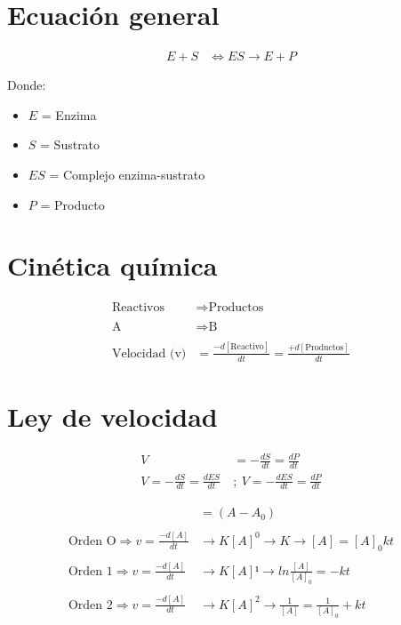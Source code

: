 \section{Ecuación general}

\begin{align*}
    E+S &\Longleftrightarrow ES \longrightarrow E + P
\end{align*}

Donde:

\begin{itemize}
    \item $E$ = Enzima
    \item $S$ = Sustrato
    \item $ES$ = Complejo enzima-sustrato
    \item $P$ = Producto
\end{itemize}

\section{Cinética química}

\begin{align*}
    \text{Reactivos} &\Longrightarrow \text{Productos} 
    \\
    \\
    \text{A} &\Longrightarrow \text{B}
    \\
    \\
    \text{Velocidad (v)} &= \frac{-d[\text{Reactivo}]}{dt}=\frac{+d[\text{Productos}]}{dt}
\end{align*}

\section{Ley de velocidad}

\begin{align*}
    V &= -\frac{dS}{dt} = \frac{dP}{dt}
    \\
    V = -\frac{dS}{dt} = \frac{dES}{dt} \ &; \ V = -\frac{dES}{dt} = \frac{dP}{dt}
\end{align*}

\begin{align*}
    [A] &= (A-A_0)
    \\
    \\
    \text{Orden O} \Longrightarrow v = \frac{-d[A]}{dt} &\rightarrow K[A]^0 \rightarrow K \rightarrow [A] = [A]_0kt
    \\
    \\
    \text{Orden 1} \Longrightarrow v = \frac{-d[A]}{dt} &\rightarrow K[A]¹
    \rightarrow ln \frac{[A]}{[A]_0} = -kt
    \\
    \\
    \text{Orden 2} \Longrightarrow v = \frac{-d[A]}{dt} &\rightarrow K[A]^2 \rightarrow \frac{1}{[A]} = \frac{1}{[A]_0} + kt
\end{align*}

